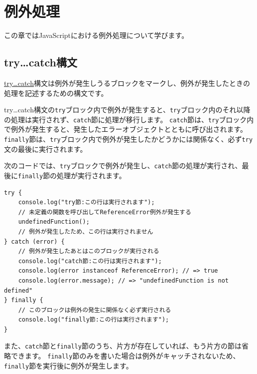 \hypertarget{error-handling}{%
\chapter{例外処理}\label{error-handling}}
\thispagestyle{frontheadings}

この章ではJavaScriptにおける例外処理について学びます。

\hypertarget{try-catch}{%
\section{try\ldots{}catch構文}\label{try-catch}}

\href{https://developer.mozilla.org/ja/docs/Web/JavaScript/Reference/Statements/try...catch}{try\ldots{}catch}構文は例外が発生しうるブロックをマークし、例外が発生したときの処理を記述するための構文です。

try\ldots{}catch構文の\texttt{try}ブロック内で例外が発生すると、\texttt{try}ブロック内のそれ以降の処理は実行されず、\texttt{catch}節に処理が移行します。
\texttt{catch}節は、\texttt{try}ブロック内で例外が発生すると、発生したエラーオブジェクトとともに呼び出されます。
\texttt{finally}節は、\texttt{try}ブロック内で例外が発生したかどうかには関係なく、必ず\texttt{try}文の最後に実行されます。

次のコードでは、\texttt{try}ブロックで例外が発生し、\texttt{catch}節の処理が実行され、最後に\texttt{finally}節の処理が実行されます。

\begin{lstlisting}
try {
    console.log("try節:この行は実行されます");
    // 未定義の関数を呼び出してReferenceError例外が発生する
    undefinedFunction();
    // 例外が発生したため、この行は実行されません
} catch (error) {
    // 例外が発生したあとはこのブロックが実行される
    console.log("catch節:この行は実行されます");
    console.log(error instanceof ReferenceError); // => true
    console.log(error.message); // => "undefinedFunction is not defined"
} finally {
    // このブロックは例外の発生に関係なく必ず実行される
    console.log("finally節:この行は実行されます");
}
\end{lstlisting}

また、\texttt{catch}節と\texttt{finally}節のうち、片方が存在していれば、もう片方の節は省略できます。
\texttt{finally}節のみを書いた場合は例外がキャッチされないため、\texttt{finally}節を実行後に例外が発生します。

